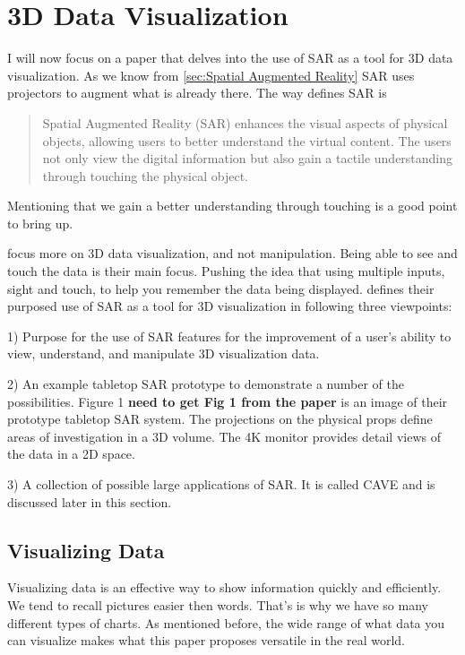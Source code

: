 \documentclass{sig-alternate}
\begin{document}
\section{3D Data Visualization}
\label{sec:3D Data Visualization}

I will now focus on a paper that delves into the use of SAR as a tool for 3D data visualization. As we know from \ref{sec:Spatial Augmented Reality} SAR uses projectors to augment what is already there. The way \cite{3D} defines SAR is 
\begin{quote}
Spatial Augmented Reality (SAR) enhances the visual aspects of physical objects, allowing users to better understand the virtual content. The users not only view the digital information but also gain a tactile understanding through touching the physical object.
\end{quote}

Mentioning that we gain a better understanding through touching is a good point to bring up. 

\cite{3D} focus more on 3D data visualization, and not manipulation. Being able to see and touch the data is their main focus. Pushing the idea that using multiple inputs, sight and touch, to help you remember the data being displayed. \cite{3D} defines their purposed use of SAR as a tool for 3D visualization in following three viewpoints: 

1) Purpose for the use of SAR features for the improvement of a user's ability to view, understand, and manipulate 3D visualization data. 

2) An example tabletop SAR prototype to demonstrate a number of the possibilities. Figure 1 \textbf{need to get Fig 1 from the paper} is an image of their prototype tabletop SAR system. The projections on the physical props define areas of investigation in a 3D volume. The 4K monitor provides detail views of the data in a 2D space. 

3) A collection of possible large applications of SAR. It is called CAVE and is discussed later in this section.
\subsection{Visualizing Data}
\label{sec:Visualizing Data}

Visualizing data is an effective way to show information quickly and efficiently. We tend to recall pictures easier then words. That's is why we have so many different types of charts. As mentioned before, the wide range of what data you can visualize makes what this paper proposes versatile in the real world.      
\end{document}
